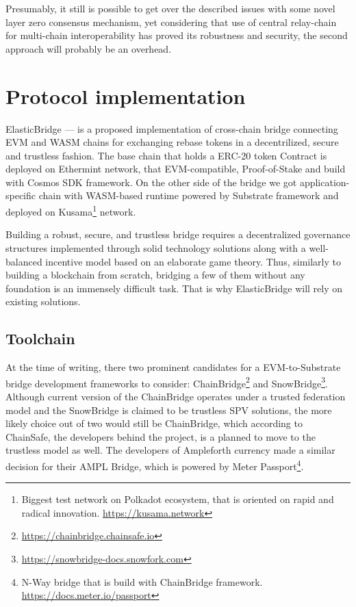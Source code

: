 \documentclass{article}
\begin{document}
Presumably, it still is possible to get over the described issues with some novel layer zero consensus mechanism, yet considering that use of central relay-chain for multi-chain interoperability has proved its robustness and security, the second approach will probably be an overhead.

\section{Protocol implementation}

ElasticBridge --- is a proposed implementation of cross-chain bridge connecting EVM and WASM chains for exchanging rebase tokens in a decentrilized, secure and trustless fashion. The base chain that holds a ERC-20 token Contract is deployed on Ethermint network, that EVM-compatible, Proof-of-Stake and build with Cosmos SDK framework. On the other side of the bridge we got application-specific chain with WASM-based runtime powered by Substrate framework and deployed on Kusama\footnote{Biggest test network on Polkadot ecosystem, that is oriented on rapid and radical innovation. \url{https://kusama.network}} network.

Building a robust, secure, and trustless bridge requires a decentralized governance structures implemented through solid technology solutions along with a well-balanced incentive model based on an elaborate game theory. Thus, similarly to building a blockchain from scratch, bridging a few of them without any foundation is an immensely difficult task. That is why ElasticBridge will rely on existing solutions.

\subsection{Toolchain}

At the time of writing, there two prominent candidates for a EVM-to-Substrate bridge development frameworks to consider: ChainBridge\footnote{\url{https://chainbridge.chainsafe.io}} and SnowBridge\footnote{\url{https://snowbridge-docs.snowfork.com}}. Although current version of the ChainBridge operates under a trusted federation model and the SnowBridge is claimed to be trustless SPV solutions, the more likely choice out of two would still be ChainBridge, which according to ChainSafe, the developers behind the project, is a planned to move to the trustless model as well. The developers of Ampleforth currency made a similar decision for their AMPL Bridge, which is powered by Meter Passport\footnote{N-Way bridge that is build with ChainBridge framework. \url{https://docs.meter.io/passport}}. 
\end{document}
